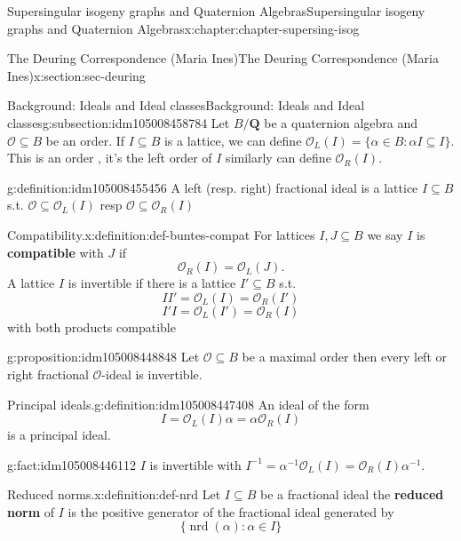 \documentclass[oneside,10pt,]{book}
\newcommand{\terminology}[1]{\textbf{#1}}
\numberwithin{equation}{section}
\newcommand{\inv}{^{-1}}
\newcommand{\QQ}{\mathbf{Q}}
\newcommand{\ints}{\mathcal{O}}
\begin{document}
\begin{chapterptx}{Supersingular isogeny graphs and Quaternion Algebras}{}{Supersingular isogeny graphs and Quaternion Algebras}{}{}{x:chapter:chapter-supersing-isog}
\begin{sectionptx}{The Deuring Correspondence (Maria Ines)}{}{The Deuring Correspondence (Maria Ines)}{}{}{x:section:sec-deuring}
\begin{subsectionptx}{Background: Ideals and Ideal classes}{}{Background: Ideals and Ideal classes}{}{}{g:subsection:idm105008458784}
Let \(B/\QQ\) be a quaternion algebra and  \(\ints \subseteq B\) be an order. If \(I \subseteq B \) is a  lattice, we can define \(\ints_L (I) = \{ \alpha\in  B :  \alpha I  \subseteq I \}\). This is an order , it's the left order of  \(I\) similarly can define \(\ints_R (I) \).%
\begin{definition}{}{g:definition:idm105008455456}%
A left (resp. right) fractional ideal is a lattice \(I \subseteq B\) s.t. \(\ints \subseteq       \ints_L (I) \) resp \(\ints \subseteq \ints_R (I) \)%
\end{definition}
\begin{definition}{Compatibility.}{x:definition:def-buntes-compat}%
For lattices \(I,J \subseteq B\) we say \(I\) is \terminology{compatible} with \(J\) if%
\begin{equation*}
\ints_R(I)= \ints_L(J)\text{.}
\end{equation*}
A lattice \(I \) is invertible if there is a lattice \(I' \subseteq B\) s.t.%
\begin{equation*}
II' = \ints_L(I) =  \ints_R(I')
\end{equation*}
%
\begin{equation*}
I'I = \ints_L(I') =  \ints_R(I)
\end{equation*}
with both products compatible%
\end{definition}
\begin{proposition}{}{}{g:proposition:idm105008448848}%
Let \(\ints \subseteq B\) be a maximal order then every left or right fractional \(\ints\)-ideal is invertible.%
\end{proposition}
\begin{definition}{Principal ideals.}{g:definition:idm105008447408}%
An ideal of the form%
\begin{equation*}
I =  \ints_L(I) \alpha =  \alpha\ints_R(I)
\end{equation*}
is a principal ideal.%
\end{definition}
\begin{fact}{}{}{g:fact:idm105008446112}%
\(I \) is invertible with \(I\inv = \alpha \inv \ints_L(I) =  \ints_R(I) \alpha \inv\).%
\end{fact}
\begin{definition}{Reduced norms.}{x:definition:def-nrd}%
Let \(I \subseteq B\) be a fractional ideal the \terminology{reduced norm} of \(I \) is the positive generator of the fractional ideal generated by%
\begin{equation*}
\{ \operatorname{nrd} (\alpha) :  \alpha \in I \}
\end{equation*}

\end{definition}
\end{subsectionptx}
\end{sectionptx}
\end{chapterptx}
\end{document}
